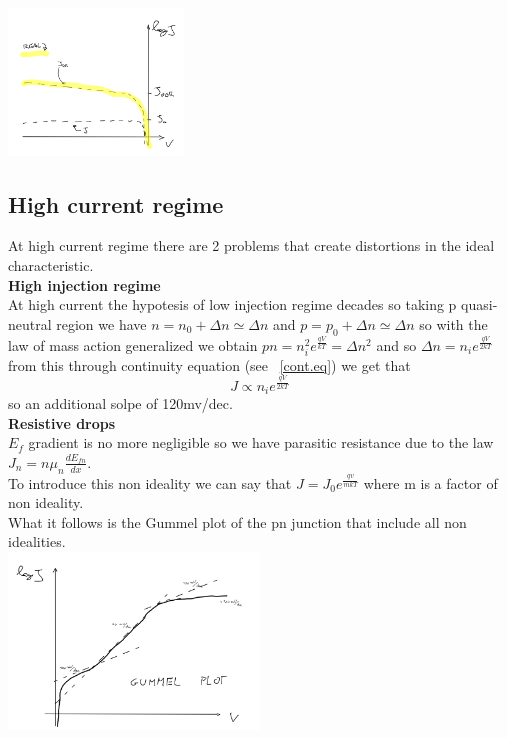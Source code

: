 \centering
\includegraphics[width=0.35\textwidth]{inverselow.png}\\
\raggedright

\subsection{High current regime}
At high current regime there are 2 problems that create distortions in the ideal characteristic.\\
{\bf High injection regime}\\
At high current the hypotesis of low injection regime decades so taking p quasi-neutral region we have $n=n_0+\Delta n\simeq\Delta n$ and $p=p_0+\Delta n\simeq \Delta n$ so with the law of mass action generalized we obtain $pn=n_i^2e^{\frac{qV}{kT}}=\Delta n^2$ and so $\Delta n=n_ie^{\frac{qV}{2kT}}$ from this through continuity equation (see ~\ref{cont.eq}) we get that 
\begin{equation}
J\propto n_ie^{\frac{qV}{2kT}}
\end{equation}
so an additional solpe of 120mv/dec.\\ 
{\bf Resistive drops}\\
$E_f$ gradient is no more negligible so we have parasitic resistance due to the law $J_n=n\mu_n \frac{dE_{fn}}{dx}$.\\
To introduce this non ideality we can say that $J=J_0e^{\frac{qv}{mkT}}$ where m is a factor of non ideality.\\
What it follows is the Gummel plot of the pn junction that include all non idealities.\\

\centering
\includegraphics[width=0.5\textwidth]{gummel.png}\\
\raggedright

